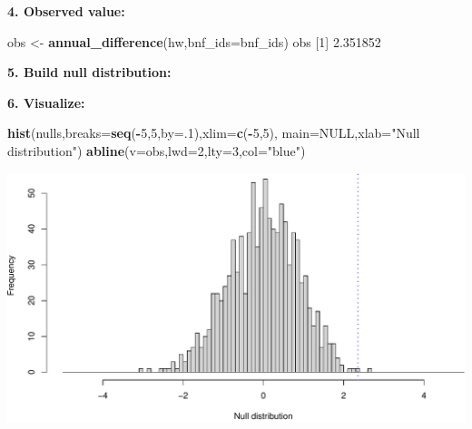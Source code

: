 \documentclass[]{book}
\newenvironment{Shaded}{\begin{snugshade}}{\end{snugshade}}
\newcommand{\ControlFlowTok}[1]{\textcolor[rgb]{0.13,0.29,0.53}{\textbf{#1}}}
\newcommand{\DataTypeTok}[1]{\textcolor[rgb]{0.13,0.29,0.53}{#1}}
\newcommand{\DecValTok}[1]{\textcolor[rgb]{0.00,0.00,0.81}{#1}}
\newcommand{\FloatTok}[1]{\textcolor[rgb]{0.00,0.00,0.81}{#1}}
\newcommand{\KeywordTok}[1]{\textcolor[rgb]{0.13,0.29,0.53}{\textbf{#1}}}
\newcommand{\NormalTok}[1]{#1}
\newcommand{\OperatorTok}[1]{\textcolor[rgb]{0.81,0.36,0.00}{\textbf{#1}}}
\newcommand{\OtherTok}[1]{\textcolor[rgb]{0.56,0.35,0.01}{#1}}
\newcommand{\StringTok}[1]{\textcolor[rgb]{0.31,0.60,0.02}{#1}}
\begin{document}
\textbf{4. Observed value:}

\begin{Shaded}
\begin{Highlighting}[]
\NormalTok{obs <-}\StringTok{ }\KeywordTok{annual_difference}\NormalTok{(hw,}\DataTypeTok{bnf_ids=}\NormalTok{bnf_ids)}
\NormalTok{obs }
\NormalTok{[}\DecValTok{1}\NormalTok{] }\FloatTok{2.351852}
\end{Highlighting}
\end{Shaded}

\textbf{5. Build null distribution:}

\begin{Shaded}
\end{Shaded}

\textbf{6. Visualize:}

\begin{Shaded}
\begin{Highlighting}[]
\KeywordTok{hist}\NormalTok{(nulls,}\DataTypeTok{breaks=}\KeywordTok{seq}\NormalTok{(}\OperatorTok{-}\DecValTok{5}\NormalTok{,}\DecValTok{5}\NormalTok{,}\DataTypeTok{by=}\NormalTok{.}\DecValTok{1}\NormalTok{),}\DataTypeTok{xlim=}\KeywordTok{c}\NormalTok{(}\OperatorTok{-}\DecValTok{5}\NormalTok{,}\DecValTok{5}\NormalTok{),}
     \DataTypeTok{main=}\OtherTok{NULL}\NormalTok{,}\DataTypeTok{xlab=}\StringTok{"Null distribution"}\NormalTok{)}
\KeywordTok{abline}\NormalTok{(}\DataTypeTok{v=}\NormalTok{obs,}\DataTypeTok{lwd=}\DecValTok{2}\NormalTok{,}\DataTypeTok{lty=}\DecValTok{3}\NormalTok{,}\DataTypeTok{col=}\StringTok{"blue"}\NormalTok{)}
\end{Highlighting}
\end{Shaded}

\includegraphics{figures/unnamed-chunk-690-1.pdf}
\end{document}
